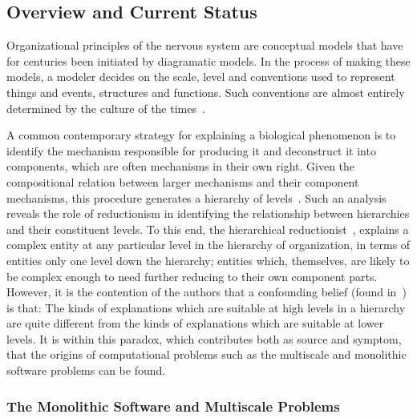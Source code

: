 \documentclass[10pt,letterpaper]{article}
\begin{document}
\subsection*{Overview and Current Status}

Organizational principles of the nervous system are conceptual models that have for centuries been initiated by diagramatic models. In the process of making these models, a modeler decides on the scale, level and conventions used to represent things and events, structures and functions. Such conventions are almost entirely determined by the culture of the times~\cite{jacobson93,sperry80}.

A common contemporary strategy for explaining a biological phenomenon is to identify the mechanism responsible for producing it and deconstruct it into components, which are often mechanisms in their own right. Given the compositional relation between larger mechanisms and their component mechanisms, this procedure generates a hierarchy of levels~\cite{bechtel22}. Such an analysis reveals the role of reductionism in identifying the relationship between hierarchies and their constituent levels. To this end, the hierarchical reductionist~\cite{dawkins06}, explains a complex entity at any particular level in the hierarchy of organization, in terms of entities only one level down the hierarchy; entities which, themselves, are likely to be complex enough to need further reducing to their own component parts. However, it is the contention of the authors that a confounding belief (found in~\cite{dawkins06}) is that: The kinds of explanations which are suitable at high levels in a hierarchy are quite different from the kinds of explanations which are suitable at lower levels. It is within this paradox, which contributes both as source and symptom, that the origins of computational problems such as the multiscale and monolithic software problems can be found.  

\subsubsection*{The Monolithic Software and Multiscale Problems}
\end{document}
